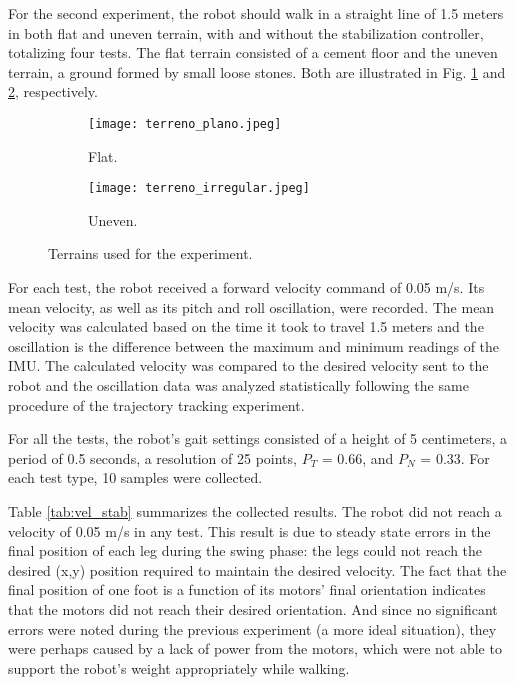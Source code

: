 \documentclass[conference]{IEEEtran}
\begin{document}
For the second experiment, the robot should walk in a straight line of 1.5 meters in both flat and uneven terrain, with and without the stabilization controller, totalizing four tests. The flat terrain consisted of a cement floor and the uneven terrain, a ground formed by small loose stones. Both are illustrated in Fig. \ref{fig:terreno_plano} and \ref{fig:terreno_uneven}, respectively.

\begin{figure}[b]
  \centering
  \begin{subfigure}[htbp]{0.24\textwidth}
    \centering
    \texttt{[image: terreno\_plano.jpeg]}
    \caption{Flat.}
    \label{fig:terreno_plano}
  \end{subfigure}
  \begin{subfigure}[htbp]{0.24\textwidth}
    \centering
    \texttt{[image: terreno\_irregular.jpeg]}
    \caption{Uneven.}
    \label{fig:terreno_uneven}
  \end{subfigure}
  \vfill
  \caption{Terrains used for the experiment.}
  \label{fig:terrenos}
\end{figure}

For each test, the robot received a forward velocity command of 0.05 m/s. Its mean velocity, as well as its pitch and roll oscillation, were recorded. The mean velocity was calculated based on the time it took to travel 1.5 meters and the oscillation is the difference between the maximum and minimum readings of the IMU. The calculated velocity was compared to the desired velocity sent to the robot and the oscillation data was analyzed statistically following the same procedure of the trajectory tracking experiment.

For all the tests, the robot's gait settings consisted of a height of 5 centimeters, a period of 0.5 seconds, a resolution of 25 points, $P_T$ = 0.66, and $P_N$ = 0.33. For each test type, 10 samples were collected.

Table \ref{tab:vel_stab} summarizes the collected results. The robot did not reach a velocity of 0.05 m/s in any test. This result is due to steady state errors in the final position of each leg during the swing phase: the legs could not reach the desired (x,y) position required to maintain the desired velocity. The fact that the final position of one foot is a function of its motors' final orientation indicates that the motors did not reach their desired orientation. And since no significant errors were noted during the previous experiment (a more ideal situation), they were perhaps caused by a lack of power from the motors, which were not able to support the robot's weight appropriately while walking.
\end{document}

